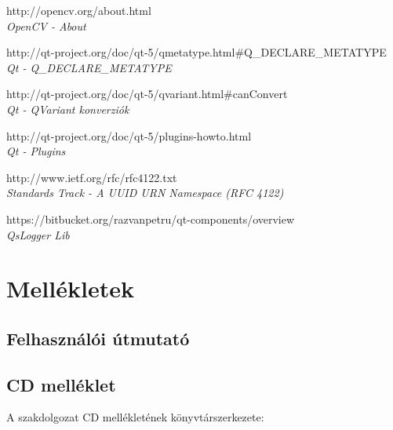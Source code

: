 \documentclass[a4paper,12pt,oneside]{report}
\begin{document}
\begin{thebibliography}{99}
        http://opencv.org/about.html\\
        {\em OpenCV - About}  

		http://qt-project.org/doc/qt-5/qmetatype.html\#Q\_DECLARE\_METATYPE\\
        {\em Qt - Q\_DECLARE\_METATYPE}  

		http://qt-project.org/doc/qt-5/qvariant.html\#canConvert\\
        {\em Qt - QVariant konverziók}  

		http://qt-project.org/doc/qt-5/plugins-howto.html\\
        {\em Qt - Plugins}  

		http://www.ietf.org/rfc/rfc4122.txt\\
        {\em Standards Track  - A UUID URN Namespace (RFC 4122) }  
        
		https://bitbucket.org/razvanpetru/qt-components/overview\\
        {\em QsLogger Lib }  

\end{thebibliography}


\section{Mellékletek}



\subsection{Felhasználói útmutató}

\subsection{CD melléklet}
A szakdolgozat CD mellékletének könyvtárszerkezete:
\end{document}
